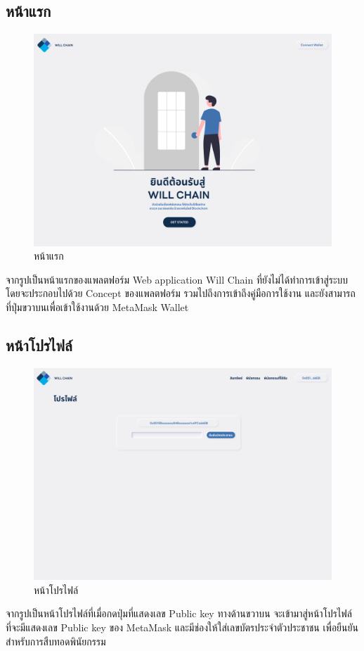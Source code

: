 \documentclass[12pt,oneside,openright,a4paper]{cpe-thai-project}
\begin{document}
\subsection{หน้าแรก}
		\begin{figure}[!thb]
			\centering
			\includegraphics[scale=0.2]{Home}
			\caption{หน้าแรก}
		\end{figure}
		\FloatBarrier
		\tab จากรูปเป็นหน้าแรกของแพลตฟอร์ม Web application Will Chain ที่ยังไม่ได้ทำการเข้าสู่ระบบ โดยจะประกอบไปด้วย Concept ของแพลตฟอร์ม รวมไปถึงการเข้าถึงคู่มือการใช้งาน และยังสามารถที่ปุ่มขวาบนเพื่อเข้าใช้งานด้วย MetaMask Wallet
\subsection{หน้าโปรไฟล์}
		\begin{figure}[!thb]
			\centering
			\includegraphics[scale=0.2]{profile}
			\caption{หน้าโปรไฟล์}
		\end{figure}
		\FloatBarrier
		\tab จากรูปเป็นหน้าโปรไฟล์ที่เมื่อกดปุ่มที่แสดงเลข Public key ทางด้านขวาบน จะเข้ามาสู่หน้าโปรไฟล์ ที่จะมีแสดงเลข Public key ของ MetaMask และมีช่องให้ใส่เลขบัตรประจำตัวประชาชน เพื่อยืนยันสำหรับการสืบทอดพินัยกรรม
\end{document}
